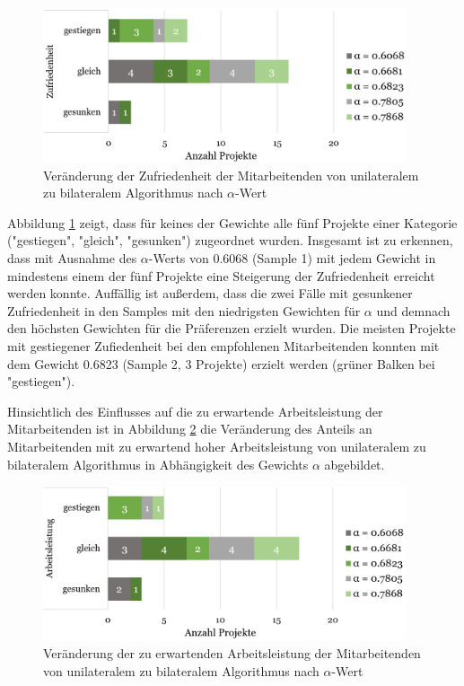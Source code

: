 \begin{figure}[H]
    \centering
	\includegraphics[width=0.95\textwidth]{gfx/verhaeltnis-z-nach-alpha-ges.png}
	\caption[Veränderung der Zufriedenheit der Mitarbeitenden von unilateralem zu bilateralem Algorithmus nach $\alpha$-Wert]{Veränderung der Zufriedenheit der Mitarbeitenden von unilateralem zu bilateralem Algorithmus nach $\alpha$-Wert}
	\label{fig:ergebnisse:abb12}
\end{figure}

Abbildung \ref{fig:ergebnisse:abb12} zeigt, dass für keines der Gewichte alle fünf Projekte einer Kategorie ("gestiegen", "gleich", "gesunken") zugeordnet wurden.
Insgesamt ist zu erkennen, dass mit Ausnahme des $\alpha$-Werts von 0.6068 (Sample 1) mit jedem Gewicht in mindestens einem der fünf Projekte eine Steigerung der Zufriedenheit erreicht werden konnte.
Auffällig ist außerdem, dass die zwei Fälle mit gesunkener Zufriedenheit in den Samples mit den niedrigsten Gewichten für $\alpha$ und demnach den höchsten Gewichten für die Präferenzen erzielt wurden.
Die meisten Projekte mit gestiegener Zufiedenheit bei den empfohlenen Mitarbeitenden konnten mit dem Gewicht 0.6823 (Sample 2, 3 Projekte) erzielt werden (grüner Balken bei "gestiegen").

Hinsichtlich des Einflusses auf die zu erwartende Arbeitsleistung der Mitarbeitenden ist in Abbildung \ref{fig:ergebnisse:abb13} die Veränderung des Anteils an Mitarbeitenden mit zu erwartend hoher Arbeitsleistung von unilateralem zu bilateralem Algorithmus in Abhängigkeit des Gewichts $\alpha$ abgebildet.

\begin{figure}[H]
    \centering
	\includegraphics[width=0.95\textwidth]{gfx/verhaeltnis-a-nach-alpha-ges.png}
	\caption[Veränderung der zu erwartenden Arbeitsleistung der Mitarbeitenden von unilateralem zu bilateralem Algorithmus nach $\alpha$-Wert]{Veränderung der zu erwartenden Arbeitsleistung der Mitarbeitenden von unilateralem zu bilateralem Algorithmus nach $\alpha$-Wert}
	\label{fig:ergebnisse:abb13}
\end{figure}

